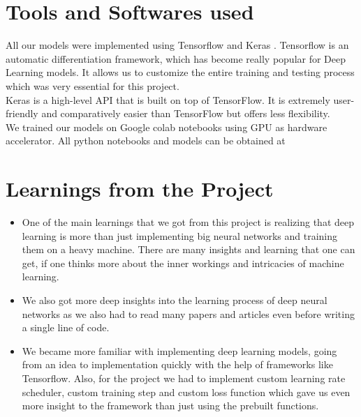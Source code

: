 \documentclass{article} %
\begin{document}
	\section{Tools and Softwares used}
	All our models were implemented using Tensorflow \cite{abadi2016tensorflow} and Keras \cite{chollet2015keras}. Tensorflow is an automatic differentiation framework, which has become really popular for Deep Learning models. %
	It allows us to customize the entire training and testing process which was very essential for this project.\\
	Keras is a high-level API that is built on top of TensorFlow. It is extremely user-friendly and comparatively easier than TensorFlow but offers less flexibility.\\
	We trained our models on Google colab notebooks using GPU as hardware accelerator. 
	All python notebooks and models can be obtained at \href{https://github.com/vaithak/Knowledge\_Distillation}{\color{blue}{https://github.com/vaithak/Knowledge\_Distillation}}
	
	
	\section{Learnings from the Project}
	\begin{itemize}
		\item One of the main learnings that we got from this project is realizing that deep learning is more than just implementing big neural networks and training them on a heavy machine. There are many insights and learning that one can get, if one thinks more about the inner workings and intricacies of machine learning.
		
		\item We also got more deep insights into the learning process of deep neural networks as we also had to read many papers and articles even before writing a single line of code.
		
		\item We became more familiar with implementing deep learning models, going from an idea to implementation quickly with the help of frameworks like Tensorflow. Also, for the project we had to implement custom learning rate scheduler, custom training step and custom loss function which gave us even more insight to the framework than just using the prebuilt functions.
		
	\end{itemize}
	
\end{document}
